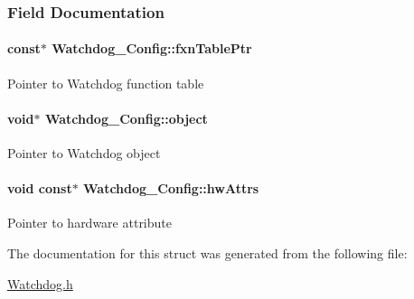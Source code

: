 \subsubsection{Field Documentation}
\paragraph[{fxn\-Table\-Ptr}]{ const$\ast$ Watchdog\-\_\-\-Config\-::fxn\-Table\-Ptr}\label{struct_watchdog___config_a89184eb9474db817513b06dfd86bf96f}
Pointer to Watchdog function table 
\paragraph[{object}]{\setlength{\rightskip}{0pt plus 5cm}void$\ast$ Watchdog\-\_\-\-Config\-::object}\label{struct_watchdog___config_aa8602245e364f7f910255dbcb14f51d1}
Pointer to Watchdog object 
\paragraph[{hw\-Attrs}]{\setlength{\rightskip}{0pt plus 5cm}void const$\ast$ Watchdog\-\_\-\-Config\-::hw\-Attrs}\label{struct_watchdog___config_a96131766bd4da7bc2239eed02f15bed0}
Pointer to hardware attribute 

The documentation for this struct was generated from the following file\-:\begin{DoxyCompactItemize}
\item 
\hyperlink{_watchdog_8h}{Watchdog.\-h}\end{DoxyCompactItemize}

